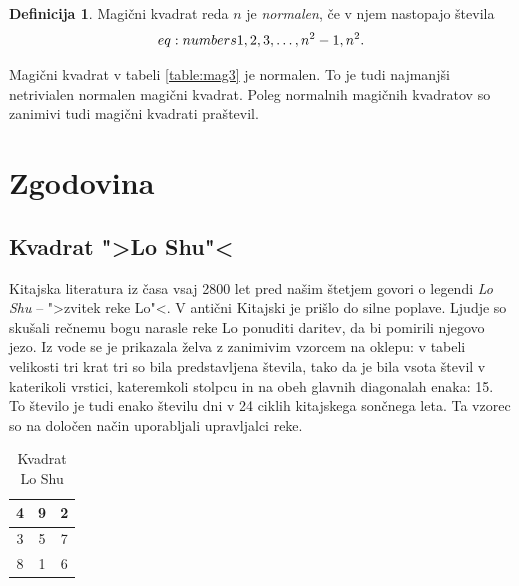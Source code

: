 \documentclass[a4paper,12pt]{article}
\theoremstyle{definition}
\newtheorem{definicija}{Definicija}
\theoremstyle{plain}
\begin{document}
 \begin{definicija}
   Magični kvadrat reda $n$ je \emph{normalen}, če v njem nastopajo števila
   \begin{equation}
      \label: {eq:numbers}
      1, 2, 3, \ldots, n^2-1, n^2.
   \end{equation}
 \end{definicija}

Magični kvadrat v tabeli \ref{table:mag3} je normalen.
To je tudi najmanjši netrivialen normalen magični kvadrat.
Poleg normalnih magičnih kvadratov so zanimivi tudi magični kvadrati praštevil.


\section{Zgodovina}

\subsection{Kvadrat ">Lo Shu"<}

Kitajska literatura iz časa vsaj 2800 let pred našim štetjem govori o legendi
\emph{Lo Shu} -- ">zvitek reke Lo"<. V antični Kitajski je prišlo do
silne poplave. Ljudje so skušali rečnemu bogu narasle reke Lo ponuditi daritev,
da bi pomirili njegovo jezo. Iz vode se je prikazala želva z zanimivim vzorcem
na oklepu: v tabeli velikosti tri krat tri so bila predstavljena števila, tako
da je bila vsota števil v katerikoli vrstici, kateremkoli stolpcu in na obeh
glavnih diagonalah enaka: 15. To število je tudi enako številu dni v 24 ciklih
kitajskega sončnega leta. Ta vzorec so na določen način uporabljali upravljalci
reke.
\begin{table}[h!]
   \centering
   \caption{Kvadrat Lo Shu}
   \label{table:loshu}  
\begin{tabular}{|c|c|c|} \hline
   4 & 9 & 2 \\\hline
   3 & 5 & 7 \\\hline
   8 & 1 & 6 \\\hline
\end{tabular}
\end{table}

\end{document}
